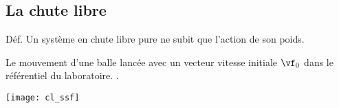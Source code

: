 \documentclass[../main/main.tex]{subfiles}
\begin{document}
\subsection{La chute libre}
\begin{rdefi}{Déf.}
    Un système en chute libre pure ne subit que l'action de son poids.
\end{rdefi}

\hspace*{-.75cm}
\begin{minipage}{0.65\linewidth}
    \begin{enumerate}[label=\sqenumi]
         Le mouvement d'une balle lancée avec un
            vecteur vitesse initiale $\vf_0$ dans le référentiel du laboratoire.
        . \bigbreak
    \end{enumerate}
\end{minipage}
\hfill
\begin{minipage}{0.30\linewidth}
    \begin{center}
        \texttt{[image: cl\_ssf]}
    \end{center}
\end{minipage}
\end{document}
